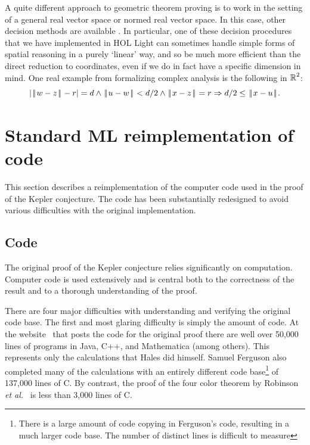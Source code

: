 \documentclass[11pt]{amsart}
\def\|{{\hskip0.1em|\hskip-0.15em|\hskip0.1em}}
\newcommand{\real}{\mbox{$\protect\mathbb R$}}
\let\And=\wedge                    %
\newcommand{\Imp}{\Rightarrow}
\begin{document}
A quite different approach to geometric theorem proving is to work in the
setting of a general real vector space or normed real vector space. In this
case, other decision methods are available \cite{solovay-jointpaper}. In
particular, one of these decision procedures that we have implemented in HOL
Light can sometimes handle simple forms of spatial reasoning in a purely
`linear' way, and so be much more efficient than the direct reduction to
coordinates, even if we do in fact have a specific dimension in mind. One
real example from formalizing complex analysis is the following in $\real^2$:
$$ |\|w - z\| - r| = d \And \|u - w\| < d/2 \And \|x - z\| = r
   \Imp d/2 \leq \|x - u\|.
$$

\section{Standard ML reimplementation of code}
\label{sec:code}

This section describes a reimplementation of the computer code 
used in the proof of the Kepler conjecture. 
The code has been substantially
redesigned to avoid various difficulties
with the original implementation.

\subsection{Code}

The original proof of the Kepler conjecture relies significantly on
computation. Computer code is used extensively and is central both to
the correctness of the result and to a thorough understanding of the
proof.

  There are four major difficulties with understanding and verifying
the original code base. The first and most glaring difficulty is
simply the amount of code. At the website~\cite{website:Hales:1998:Code}
that posts the code for the original proof
there are well over 50,000 lines of programs in Java, C++, and
Mathematica (among others). This represents only the calculations that Hales did himself.
Samuel Ferguson also completed many of the calculations with an entirely
different code base\footnote{There is a large amount of
code copying in Ferguson's code, resulting in a much larger code base.
The number of distinct lines is difficult to measure} of 137,000 lines of C. By
contrast, the proof of the four color theorem by Robinson \textit{et
al.}~\cite{Robertson:1997:JCTB} is less than 3,000 lines of C.
\end{document}
